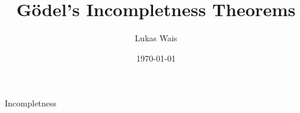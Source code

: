 \documentclass[a4paper]{article}
\title{Gödel's Incompletness Theorems}
\author{Lukas Wais}
\date{\today}
\begin{document}
	\maketitle
	{Incompletness}
\end{document}
